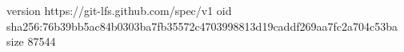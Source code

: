 version https://git-lfs.github.com/spec/v1
oid sha256:76b39bb5ac84b0303ba7fb35572c4703998813d19caddf269aa7fc2a704c53ba
size 87544
